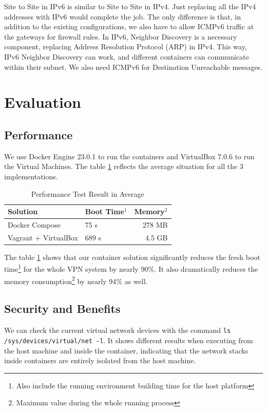 \documentclass[article]{aaltoseries}
\begin{document}
Site to Site in IPv6 is similar to Site to Site in IPv4. Just replacing all the IPv4 addresses with IPv6 would complete the job. The only difference is that, in addition to the existing configurations, we also have to allow ICMPv6 traffic at the gateways for firewall rules. In IPv6, Neighbor Discovery is a necessary component, replacing Address Resolution Protocol (ARP) in IPv4. This way, IPv6 Neighbor Discovery can work, and different containers can communicate within their subnet. We also need ICMPv6 for Destination Unreachable messages.


\section{Evaluation}
\subsection{Performance}
We use Docker Engine 23.0.1 to run the containers and VirtualBox 7.0.6 to run the Virtual Machines. The table \ref{tab:result} reflects the average situation for all the 3 implementations.

\begin{table}[t!]
  \begin{center}
    \begin{tabular}{|l|lr|}
    \hline
    Solution               & Boot Time$^1$ & Memory$^2$ \\
    \hline
    Docker Compose         &   75 s    &  278 MB \\
    Vagrant + VirtualBox   &  689 s    &  4.5 GB \\
    \hline
    \end{tabular}
    \caption{Performance Test Result in Average}
    \label{tab:result}
  \end{center}
\end{table}

The table \ref{tab:result} shows that our container solution significantly reduces the fresh boot time\footnote{Also include the running environment building time for the host platform} for the whole VPN system by nearly 90\%. It also dramatically reduces the memory consumption\footnote{Maximum value during the whole running process} by nearly 94\% as well.

\subsection{Security and Benefits}
We can check the current virtual network devices with the command \texttt{ls /sys/devices/virtual/net -l}. It shows different results when executing from the host machine and inside the container, indicating that the network stacks inside containers are entirely isolated from the host machine.
\end{document}
